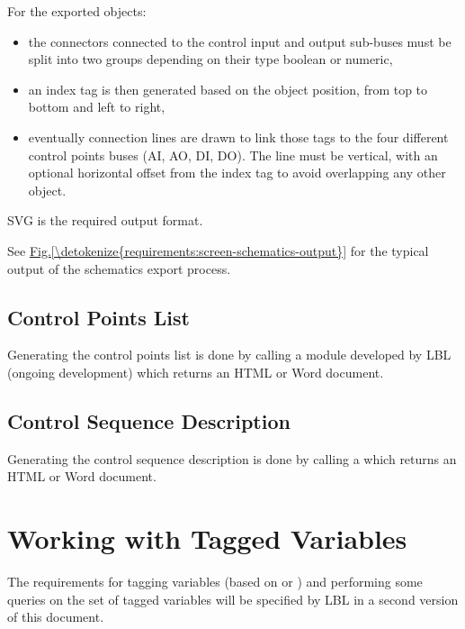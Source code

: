 \documentclass[letterpaper,10pt, openany,english]{sphinxmanual}
\begin{document}
For the exported objects:
\begin{itemize}
\item {} 
the connectors connected to the control input and output sub-buses must be split into two groups depending on their type \textendash{} boolean or numeric,

\item {} 
an index tag is then generated based on the object position, from top to bottom and left to right,

\item {} 
eventually connection lines are drawn to link those tags to the four different control points buses (AI, AO, DI, DO). The line must be vertical, with an optional horizontal offset from the index tag to avoid overlapping any other object.

\end{itemize}

SVG is the required output format.

See \hyperref[\detokenize{requirements:screen-schematics-output}]{Fig.\@ \ref{\detokenize{requirements:screen-schematics-output}}} for the typical output of the schematics export process.


\subsection{Control Points List}
\label{\detokenize{requirements:control-points-list}}
Generating the control points list is done by calling a module developed by LBL (ongoing development) which returns an HTML or Word document.


\subsection{Control Sequence Description}
\label{\detokenize{requirements:control-sequence-description}}
Generating the control sequence description is done by calling a  which returns an HTML or Word document.


\section{Working with Tagged Variables}
\label{\detokenize{requirements:working-with-tagged-variables}}\label{\detokenize{requirements:sec-tagged-variables}}
The requirements for tagging variables (based on  or ) and performing some queries on the set of tagged variables will be specified by LBL in a second version of this document.
\end{document}
